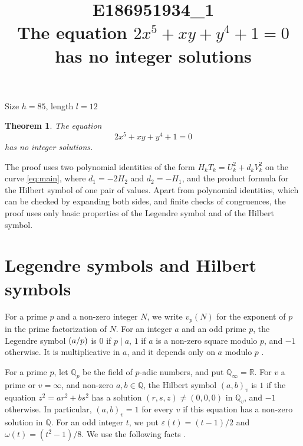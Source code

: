 \documentclass[11pt]{article}
\title{\textbf{E186951934\_1}\\[4pt] {\Large The equation $2x^{5}+xy+y^{4}+1=0$ has no integer solutions}}
\author{}
\date{}
\newtheorem{theorem}{Theorem}
\newcommand{\Q}{\mathbb{Q}}
\newcommand{\leg}[2]{\mathchoice{\biggl(\dfrac{#1}{#2}\biggr)}{(#1/#2)}{(#1/#2)}{(#1/#2)}}
\begin{document}
\maketitle
\vspace{-8ex}
\begin{center}
Size $h=85$, length $l=12$
\end{center}

\begin{theorem}\label{thm:main}
The equation
\begin{equation}\label{eq:main}
2x^{5}+xy+y^{4}+1=0
\end{equation}
has no integer solutions.
\end{theorem}

The proof uses two polynomial identities of the form $H_kT_k=U_k^2+d_kV_k^2$ on the curve \eqref{eq:main}, where $d_{1}=-2H_{2}$ and $d_{2}=-H_{1}$, and the product formula for the Hilbert symbol of one pair of values. Apart from polynomial identities, which can be checked by expanding both sides, and finite checks of congruences, the proof uses only basic properties of the Legendre symbol and of the Hilbert symbol.

\section{Legendre symbols and Hilbert symbols}

For a prime $p$ and a non-zero integer $N$, we write $v_p(N)$ for the exponent of $p$ in the prime factorization of $N$. For an integer $a$ and an odd prime $p$, the Legendre symbol $\leg{a}{p}$ is $0$ if $p\mid a$, $1$ if $a$ is a non-zero square modulo $p$, and $-1$ otherwise. It is multiplicative in $a$, and it depends only on $a$ modulo $p$ \cite[Chapter~5]{IR}.

For a prime $p$, let $\Q_p$ be the field of $p$-adic numbers, and put $\Q_\infty=\mathbb R$. For $v$ a prime or $v=\infty$, and non-zero $a,b\in\Q$, the Hilbert symbol $(a,b)_v$ is $1$ if the equation $z^2=ar^2+bs^2$ has a solution $(r,s,z)\neq(0,0,0)$ in $\Q_v$, and $-1$ otherwise. In particular, $(a,b)_v=1$ for every $v$ if this equation has a non-zero solution in $\Q$. For an odd integer $t$, we put $\varepsilon(t)=(t-1)/2$ and $\omega(t)=(t^2-1)/8$. We use the following facts \cite[Chapter~III, Proposition~2 and Theorems~1 and~3]{Se}.
\end{document}
